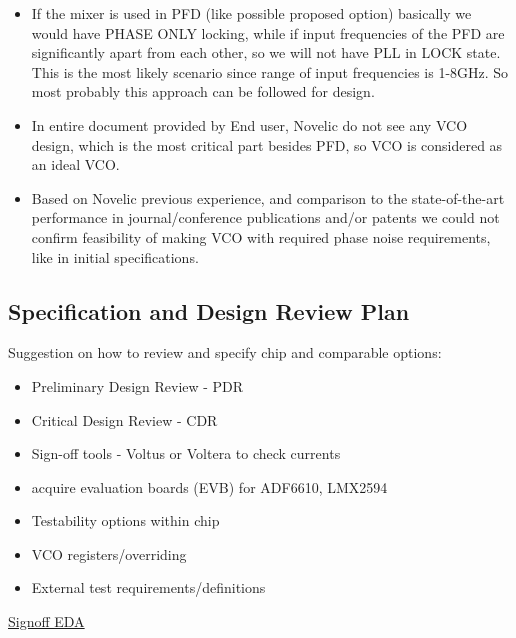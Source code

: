 \documentclass{article}
\begin{document}
\begin{itemize}
\begin{itemize}
		\item If the mixer is used in PFD (like possible proposed option) basically we would have PHASE ONLY locking, while if input frequencies of the PFD are significantly apart from each other, so we will not have PLL in LOCK state. This is the most likely scenario since range of input frequencies is 1-8GHz. So most probably this approach can be followed for design.
		\item In entire document provided by End user, Novelic do not see any VCO design, which is the most critical part besides PFD, so VCO is considered as an ideal VCO.  %
		\item Based on Novelic previous experience, and comparison to the state-of-the-art performance in journal/conference publications and/or patents we could not confirm feasibility of making VCO with required phase noise requirements, like in initial specifications. 
	\end{itemize}

\end{itemize}


\subsection{Specification and Design Review Plan} %

Suggestion on how to review and specify chip and comparable options:

\begin{itemize}
	\item Preliminary Design Review	- PDR
	\item Critical Design Review	- CDR
	\item Sign-off tools - Voltus or Voltera to check currents %
	\item acquire evaluation boards (EVB) for ADF6610, LMX2594
	\item Testability options within chip
	\item VCO registers/overriding
	\item External test requirements/definitions
\end{itemize}

\href{https://en.wikipedia.org/wiki/Signoff_(electronic_design_automation)}{Signoff EDA}
\end{document}
